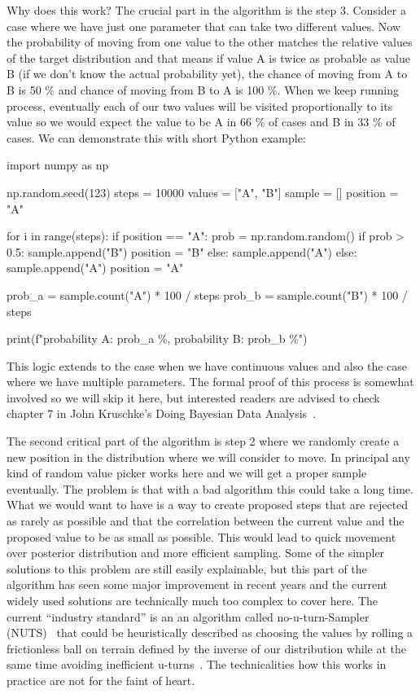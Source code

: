 \documentclass[12pt,a4paper,leqno]{report}
\theoremstyle{plain}
\theoremstyle{definition}
\theoremstyle{remark}
\begin{document}
Why does this work? The crucial part in the algorithm is the step 3. Consider a case
where we have just one parameter that can take two different values. Now the probability
of moving from one value to the other matches the relative values of the
target distribution and that means if value A is twice as probable as value B (if we don't know the
actual probability yet), the chance of moving from A to B is 50 \% and chance of moving
from B to A is 100 \%. When we keep running process, eventually each of our two values
will be visited proportionally to its value so we would expect the value to be A in 66
\% of cases and B in 33 \% of cases. We can demonstrate this with short Python
example:

\begin{pyblock}[][fontsize=\footnotesize]
import numpy as np

np.random.seed(123)
steps = 10000
values = ["A", "B"]
sample = []
position = "A"

for i in range(steps):
    if position == "A":
        prob = np.random.random()
        if prob > 0.5:
            sample.append("B")
            position = "B"
        else:
            sample.append("A")
    else:
        sample.append("A")
        position = "A"

prob_a = sample.count("A") * 100 / steps
prob_b = sample.count("B") * 100 / steps

print(f"probability A: {prob_a} \%, probability B: {prob_b} \%")
\end{pyblock}
\stdoutpythontex
\bigskip

This logic extends to the case when we have
continuous values and also the case where we have multiple parameters. The formal proof
of this process is somewhat involved so we will skip it here, but interested readers are
advised to check chapter 7 in John Kruschke's Doing Bayesian Data Analysis\ \cite{kruschke}.

The second critical part of the algorithm is step 2 where we randomly create a new
position in the distribution where we will consider to move. In principal any kind of
random value picker works here and we will get a proper sample eventually. The problem is
that with a bad algorithm this could take a long time. What we would want to have is a
way to create proposed steps that are rejected as rarely as possible and that the
correlation between the current value and the proposed value to be as small as possible.
This would lead to quick movement over posterior distribution and more efficient sampling. Some of the
simpler solutions to this problem are still easily explainable, but
this part of the algorithm has seen some major improvement in recent years and the
current widely used solutions are technically much too complex to cover here. The
current ``industry standard'' is an an algorithm called no-u-turn-Sampler (NUTS)\ \cite{nuts}
that could be heuristically described as choosing the values by rolling a frictionless
ball on terrain defined by the inverse of our distribution while at the same time
avoiding inefficient u-turns\ \cite{kruschke}. The technicalities how this works
in practice are not for the faint of heart.
\end{document}

